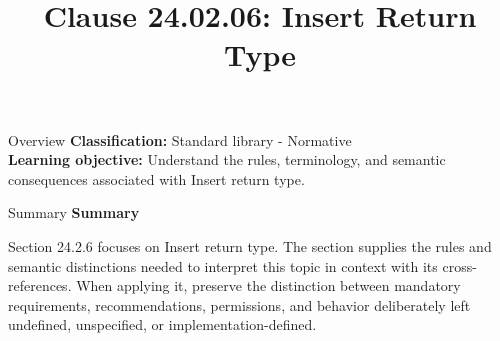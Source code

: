 \documentclass[10pt,letterpaper]{article}
\title{Clause 24.02.06: Insert Return Type}
\author{}
\date{}
\begin{document}
\maketitle
\begin{CornellOverviewBox}{Overview}
\textbf{Classification:} Standard library - Normative\\[2pt]
\textbf{Learning objective:} Understand the rules, terminology, and semantic consequences associated with Insert return type.
\end{CornellOverviewBox}\begin{CornellSummaryBox}{Summary}
{\sffamily\bfseries\color{Accent} Summary}\par\vspace{3pt}Section 24.2.6 focuses on Insert return type. The section supplies the rules and semantic distinctions needed to interpret this topic in context with its cross-references. When applying it, preserve the distinction between mandatory requirements, recommendations, permissions, and behavior deliberately left undefined, unspecified, or implementation-defined.
\end{CornellSummaryBox}
\end{document}
